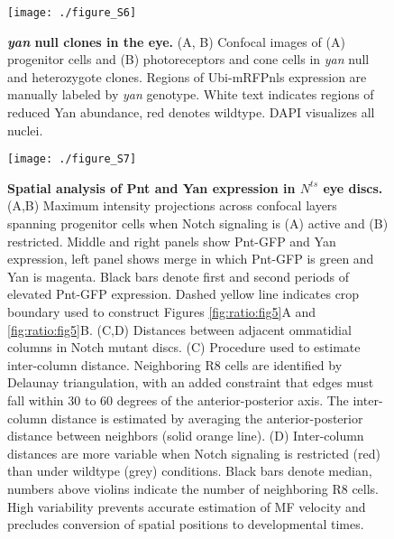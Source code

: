 \begin{figure}[h]
\centering
\texttt{[image: ./figure\_S6]}
\caption[\textit{yan} null clones in the eye.]{\textbf{\textit{yan} null clones in the eye.} (A, B) Confocal images of (A) progenitor cells and (B) photoreceptors and cone cells in \textit{yan} null and heterozygote clones. Regions of Ubi-mRFPnls expression are manually labeled by \textit{yan} genotype. White text indicates regions of reduced Yan abundance, red denotes wildtype. DAPI visualizes all nuclei.}
\label{fig:ratio:figS6}
\end{figure}

\begin{figure}[h]
\centering
\texttt{[image: ./figure\_S7]}
\caption[Spatial analysis of Pnt and Yan expression in $N^{ts}$ eye discs.]{\textbf{Spatial analysis of Pnt and Yan expression in $N^{ts}$ eye discs.} (A,B) Maximum intensity projections across confocal layers spanning progenitor cells when Notch signaling is (A) active and (B) restricted. Middle and right panels show Pnt-GFP and Yan expression, left panel shows merge in which Pnt-GFP is green and Yan is magenta. Black bars denote first and second periods of elevated Pnt-GFP expression. Dashed yellow line indicates crop boundary used to construct Figures \ref{fig:ratio:fig5}A and \ref{fig:ratio:fig5}B. (C,D) Distances between adjacent ommatidial columns in Notch mutant discs. (C) Procedure used to estimate inter-column distance. Neighboring R8 cells are identified by Delaunay triangulation, with an added constraint that edges must fall within 30 to 60 degrees of the anterior-posterior axis. The inter-column distance is estimated by averaging the anterior-posterior distance between neighbors (solid orange line). (D) Inter-column distances are more variable when Notch signaling is restricted (red) than under wildtype (grey) conditions. Black bars denote median, numbers above violins indicate the number of neighboring R8 cells. High variability prevents accurate estimation of MF velocity and precludes conversion of spatial positions to developmental times.}
\label{fig:ratio:figS7}
\end{figure}

